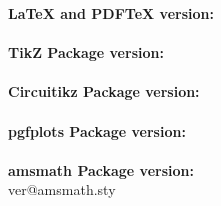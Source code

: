 \documentclass{article}
\begin{document}
    \textbf{LaTeX and PDFTeX version:} \\
    \pdftexbanner \\

    \textbf{TikZ Package version:} \\
    \pgfversion \\

    \textbf{Circuitikz Package version:} \\
    \pgfcircversion \\

    \textbf{pgfplots Package version:} \\
    \pgfplotsversion \\

    \textbf{amsmath Package version:} \\
    \def\amsmathversion{\csname ver@amsmath.sty\endcsname}%
    \amsmathversion \\
\end{document}
